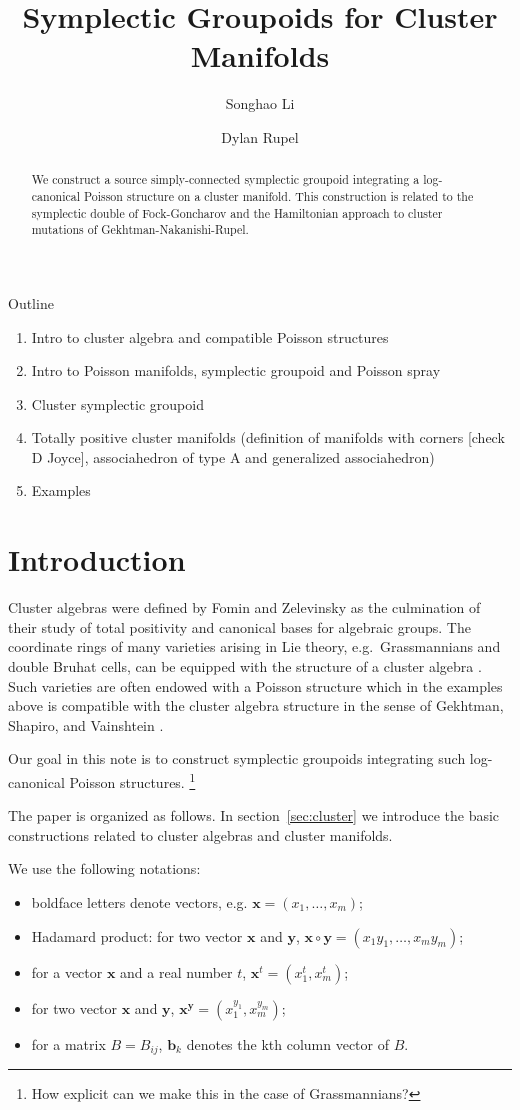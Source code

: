 \documentclass{amsart}
\title{Symplectic Groupoids for Cluster Manifolds}
\author{Songhao Li}
\author{Dylan Rupel}
\newcommand{\bfb}{\mathbf{b}}
\newcommand{\bfx}{\mathbf{x}}
\newcommand{\bfy}{\mathbf{y}}
\begin{document}
\begin{abstract}
  We construct a source simply-connected symplectic groupoid integrating a log-canonical Poisson structure on a cluster manifold.
  This construction is related to the symplectic double of Fock-Goncharov and the Hamiltonian approach to cluster mutations of Gekhtman-Nakanishi-Rupel.
\end{abstract}
\maketitle
Outline
\begin{enumerate}
	\item Intro to cluster algebra and compatible Poisson structures 
	\item Intro to Poisson manifolds, symplectic groupoid and Poisson spray
	\item Cluster symplectic groupoid
	\item Totally positive cluster manifolds (definition of manifolds with corners [check D Joyce], associahedron of type A and generalized associahedron)
	\item Examples
\end{enumerate}

\section{Introduction}
Cluster algebras were defined by Fomin and Zelevinsky \cite{fomin-zelevinsky1} as the culmination of their study of total positivity and canonical bases for algebraic groups.
The coordinate rings of many varieties arising in Lie theory, e.g.\ Grassmannians and double Bruhat cells, can be equipped with the structure of a cluster algebra \cite{berenstein-fomin-zelevinsky,scott,gekhtman-shapiro-vainshtein,williams}.
Such varieties are often endowed with a Poisson structure which in the examples above is compatible with the cluster algebra structure in the sense of Gekhtman, Shapiro, and Vainshtein \cite{gsv}.

Our goal in this note is to construct symplectic groupoids integrating such log-canonical Poisson structures.
\footnote{How explicit can we make this in the case of Grassmannians?}



The paper is organized as follows.
In section~\ref{sec:cluster} we introduce the basic constructions related to cluster algebras and cluster manifolds.

We use the following notations:
\begin{itemize}
	\item boldface letters denote vectors, e.g. $\bfx = (x_1, \ldots, x_m)$;
	\item Hadamard product: for two vector $\bfx$ and $\bfy$, $\bfx \circ \bfy = (x_1y_1, \ldots, x_my_m)$;
	\item for a vector $\bfx$ and a real number $t$, $\bfx^t = (x_1^t, x_m^t)$;
	\item for two vector $\bfx$ and $\bfy$, $\bfx^\bfy = (x_1^{y_1}, x_m^{y_m})$;
	\item for a matrix $B = B_{ij}$, $\bfb_k$ denotes the kth column vector of $B$.
\end{itemize}
\end{document}
